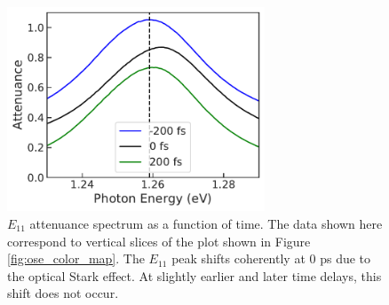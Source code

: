 \begin{figure}[ht]
  \centering
  \includegraphics[height=2.4in]{images/chapter_coherent/ose_time_traces}
  \caption{$E_{11}$ attenuance spectrum as a function of time. The data shown here correspond to vertical slices of the plot shown in Figure \ref{fig:ose_color_map}. The $E_{11}$ peak shifts coherently at 0 ps due to the optical Stark effect. At slightly earlier and later time delays, this shift does not occur. }
  \label{fig:ose_time_traces}
\end{figure}

